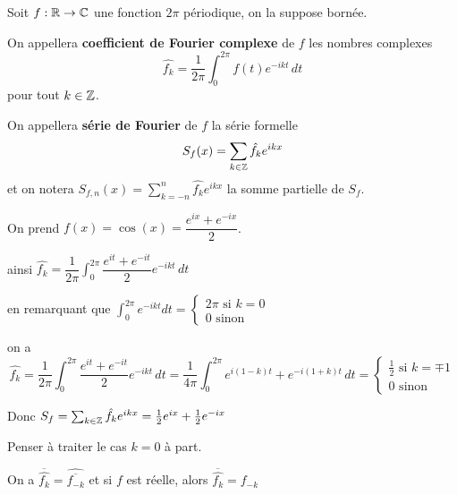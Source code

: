 \documentclass[a4paper, 12pt]{article}
\begin{document}
\begin{definition}
    Soit $f : \mathbb{R} \to \mathbb{C}$ une fonction $2\pi$ périodique, on la suppose bornée.

    On appellera \textbf{coefficient de Fourier complexe} de $f$ les nombres complexes
    $$
    \hat{f_k} = \frac{1}{2\pi} \int_0^{2\pi} f(t) e^{-ikt} \, dt
    $$
    pour tout $k \in \mathbb{Z}$.
\end{definition}

\begin{definition}
    On appellera \textbf{série de Fourier} de $f$ la série formelle
    $$
    S_f(x) = \sum_{k \in \mathbb{Z}} \hat{f_k} e^{ikx}
    $$
    et on notera $S_{f,n}(x) = \sum\limits_{k = -n}^{n} \hat{f_k} e^{ikx}$ la somme partielle de $S_f$.
\end{definition}

\begin{exemple}
    On prend $f(x) = \cos(x) = \dfrac{e^{ix} + e^{-ix}}{2}$.

    ainsi $\hat{f_k} = \dfrac{1}{2\pi} \int_0^{2\pi} \dfrac{e^{it} + e^{-it}}{2} e^{-ikt} \, dt$

    en remarquant que $\int_0^{2\pi} e^{-ikt} dt = \begin{cases}
        2\pi \text{ si } k = 0 \\
        0 \text{ sinon}
    \end{cases}$

    on a
    $$
    \hat{f_k} = \dfrac{1}{2\pi} \int_0^{2\pi} \dfrac{e^{it} + e^{-it}}{2} e^{-ikt} \, dt = \dfrac{1}{4\pi} \int_0^{2\pi} e^{i(1 - k)t} + e^{-i(1 + k)t} \, dt = \begin{cases}
    \frac{1}{2} \text{ si } k = \mp 1\\
    0 \text{ sinon}
    \end{cases}
    $$

    Donc $S_f = \sum_{k \in \mathbb{Z}} \hat{f_k} e^{ikx} = \frac{1}{2} e^{ix} + \frac{1}{2} e^{-ix}$
\end{exemple}

\begin{remarque}
    Penser à traiter le cas $k = 0$ à part.
\end{remarque}

\begin{remarque}
    On a $\overline{\hat{f_k}} = \hat{\overline{f_{-k}}}$ et si $f$ est réelle, alors $\overline{\hat{f_k}} = f_{-k}$
\end{remarque}
\end{document}
